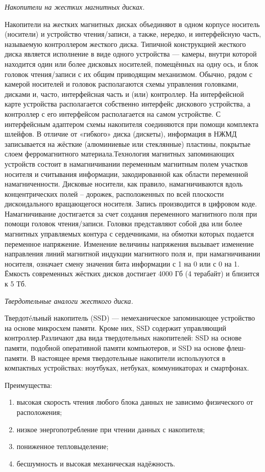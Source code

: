 \documentclass[unicode, 12pt, a4paper, oneside]{article}
\begin{document}
{\it Накопители на жестких магнитных дисках.}

Накопители на жестких магнитных дисках объединяют в одном корпусе носитель (носители) и устройство чтения/записи, а также, нередко, и интерфейсную часть, называемую контроллером жесткого диска. Типичной конструкцией жесткого диска является исполнение в виде одного устройства — камеры, внутри которой находится один или более дисковых носителей, помещённых на одну ось, и блок головок чтения/записи с их общим приводящим механизмом. Обычно, рядом с камерой носителей и головок располагаются схемы управления головками, дисками и, часто, интерфейсная часть и (или) контроллер. На интерфейсной карте устройства располагается собственно интерфейс дискового устройства, а контроллер с его интерфейсом располагается на самом устройстве. С интерфейсным адаптером схемы накопителя соединяются при помощи комплекта шлейфов.
В отличие от «гибкого» диска (дискеты), информация в НЖМД записывается на жёсткие (алюминиевые или стеклянные) пластины, покрытые слоем ферромагнитного материала.Технология магнитных запоминающих устройств состоит в намагничивании переменным магнитным полем участков носителя и считывания информации, закодированной как области переменной намагниченности. Дисковые носители, как правило, намагничиваются вдоль концентрических полей – дорожек, расположенных по всей плоскости дискоидального вращающегося носителя. Запись производится в цифровом коде. Намагничивание достигается за счет создания переменного магнитного поля при помощи головок чтения/записи. Головки представляют собой два или более магнитных управляемых контура с сердечниками, на обмотки которых подается переменное напряжение. Изменение величины напряжения вызывает изменение направления линий магнитной индукции магнитного поля и, при намагничивании носителя, означает смену значения бита информации с 1 на 0 или с 0 на 1.
Ёмкость современных жёстких дисков достигает 4000 Гб (4 терабайт) и близится к 5 Тб.

{\it Твердотельные аналоги жесткого диска.}

Твердотéльный накопитель (SSD) — немеханическое запоминающее устройство на основе микросхем памяти. Кроме них, SSD содержит управляющий контроллер.Различают два вида твердотельных накопителей: SSD на основе памяти, подобной оперативной памяти компьютеров, и SSD на основе флеш-памяти. В настоящее время твердотельные накопители используются в компактных устройствах: ноутбуках, нетбуках, коммуникаторах и смартфонах.

Преимущества:
\begin{enumerate}
\item высокая скорость чтения любого блока данных не зависимо физического от расположения;
\item низкое энергопотребление при чтении данных с накопителя;
\item пониженное тепловыделение;
\item бесшумность и высокая механическая надёжность.
\end{enumerate}
\end{document}

